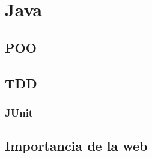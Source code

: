\chapter{Java}
	\section{POO}
	\section{TDD}
		\subsection{JUnit}
	\section{Importancia de la web}




